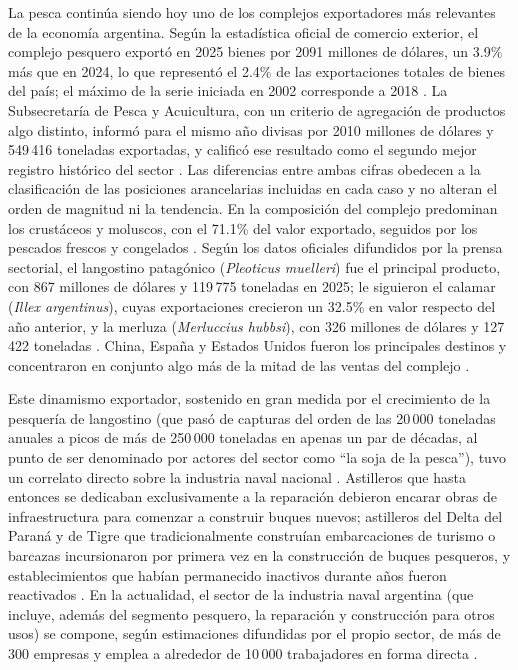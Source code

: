 La pesca continúa siendo hoy uno de los complejos exportadores más relevantes
de la economía argentina. Según la estadística oficial de comercio exterior,
el complejo pesquero exportó en 2025 bienes por 2091 millones de dólares, un
3.9\% más que en 2024, lo que representó el 2.4\% de las exportaciones totales
de bienes del país; el máximo de la serie iniciada en 2002 corresponde a 2018
\citep{indec2026complejos}. La Subsecretaría de Pesca y Acuicultura, con un
criterio de agregación de productos algo distinto, informó para el mismo año
divisas por 2010 millones de dólares y 549\,416 toneladas exportadas, y
calificó ese resultado como el segundo mejor registro histórico del sector
\citep{argentina_gob_pesca_2025}. Las diferencias entre ambas cifras obedecen a
la clasificación de las posiciones arancelarias incluidas en cada caso y no
alteran el orden de magnitud ni la tendencia. En la composición del complejo
predominan los crustáceos y moluscos, con el 71.1\% del valor exportado,
seguidos por los pescados frescos y congelados \citep{indec2026complejos}.
Según los datos oficiales difundidos por la prensa sectorial, el langostino
patagónico (\textit{Pleoticus muelleri}) fue el principal producto, con 867
millones de dólares y 119\,775 toneladas en 2025; le siguieron el calamar
(\textit{Illex argentinus}), cuyas exportaciones crecieron un 32.5\% en valor
respecto del año anterior, y la merluza (\textit{Merluccius hubbsi}), con 326
millones de dólares y 127\,422 toneladas \citep{pescare_exportaciones_2025}.
China, España y Estados Unidos fueron los principales destinos y concentraron
en conjunto algo más de la mitad de las ventas del complejo
\citep{indec2026complejos}.

Este dinamismo exportador, sostenido en gran medida por el crecimiento de la
pesquería de langostino (que pasó de capturas del orden de las 20\,000
toneladas anuales a picos de más de 250\,000 toneladas en apenas un par de
décadas, al punto de ser denominado por actores del sector como ``la soja de
la pesca''), tuvo un correlato directo sobre la industria naval nacional
\citep{argenports_industria_naval}. Astilleros que hasta entonces se dedicaban
exclusivamente a la reparación debieron encarar obras de infraestructura para
comenzar a construir buques nuevos; astilleros del Delta del Paraná y de
Tigre que tradicionalmente construían embarcaciones de turismo o barcazas
incursionaron por primera vez en la construcción de buques pesqueros, y
establecimientos que habían permanecido inactivos durante años fueron
reactivados \citep{argenports_industria_naval}. En la actualidad, el sector de
la industria naval argentina (que incluye, además del segmento pesquero, la
reparación y construcción para otros usos) se compone, según estimaciones difundidas por el propio sector, de más de
300 empresas y emplea a alrededor de 10\,000 trabajadores en forma directa
\citep{argenports_industria_naval}.

